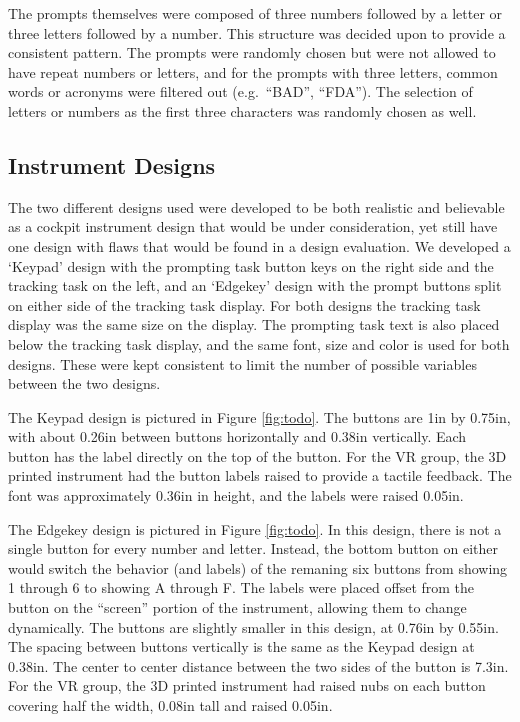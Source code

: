 The prompts themselves were composed of three numbers followed by a letter or three letters followed by a number.
This structure was decided upon to provide a consistent pattern.
The prompts were randomly chosen but were not allowed to have repeat numbers or letters, and for the prompts with three letters, common words or acronyms were filtered out (e.g.\ ``BAD'', ``FDA'').
The selection of letters or numbers as the first three characters was randomly chosen as well.

\subsection{Instrument Designs}

The two different designs used were developed to be both realistic and believable as a cockpit instrument design that would be under consideration, yet still have one design with flaws that would be found in a design evaluation.
We developed a `Keypad' design with the prompting task button keys on the right side and the tracking task on the left, and an `Edgekey' design with the prompt buttons split on either side of the tracking task display.
For both designs the tracking task display was the same size on the display.
The prompting task text is also placed below the tracking task display, and the same font, size and color is used for both designs.
These were kept consistent to limit the number of possible variables between the two designs.

The Keypad design is pictured in Figure \ref{fig:todo}.
The buttons are 1in by 0.75in, with about 0.26in between buttons horizontally and 0.38in vertically.
Each button has the label directly on the top of the button.
For the VR group, the 3D printed instrument had the button labels raised to provide a tactile feedback.
The font was approximately 0.36in in height, and the labels were raised 0.05in.

The Edgekey design is pictured in Figure \ref{fig:todo}.
In this design, there is not a single button for every number and letter.
Instead, the bottom button on either would switch the behavior (and labels) of the remaning six buttons from showing 1 through 6 to showing A through F.
The labels were placed offset from the button on the ``screen'' portion of the instrument, allowing them to change dynamically.
The buttons are slightly smaller in this design, at 0.76in by 0.55in.
The spacing between buttons vertically is the same as the Keypad design at 0.38in.
The center to center distance between the two sides of the button is 7.3in.
For the VR group, the 3D printed instrument had raised nubs on each button covering half the width, 0.08in tall and raised 0.05in.

